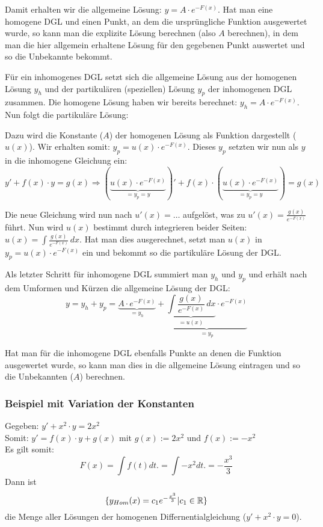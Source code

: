 Damit erhalten wir die allgemeine Lösung: $y = A \cdot e^{-F(x)}$. Hat man eine
homogene DGL und einen Punkt, an dem die ursprüngliche Funktion ausgewertet wurde,
so kann man die explizite Lösung berechnen (also $A$ berechnen), in dem man die
hier allgemein erhaltene Lösung für den gegebenen Punkt auswertet und so die
Unbekannte bekommt.

Für ein inhomogenes DGL setzt sich die allgemeine Lösung aus der homogenen Lösung
$y_h$ und der partikulären (speziellen) Lösung $y_p$ der inhomogenen DGL zusammen.
Die homogene Lösung haben wir bereits berechnet: $y_h = A \cdot e^{-F(x)}$. Nun
folgt die partikuläre Lösung:

Dazu wird die Konstante ($A$) der homogenen Lösung als Funktion dargestellt ($u(x)$).
Wir erhalten somit: $y_p = u(x) \cdot e^{-F(x)}$.
Dieses $y_p$ setzten wir nun als $y$ in die inhomogene Gleichung ein:
{\small
\[
y' + f(x) \cdot y = g(x) \Rightarrow (\underbrace{u(x) \cdot e^{-F(x)}}_{= y_p = y})'
+ f(x) \cdot (\underbrace{u(x) \cdot e^{-F(x)}}_{= y_p = y}) = g(x)
\]
}

Die neue Gleichung wird nun nach $u'(x) = \ldots$ aufgelöst, was zu
$u'(x) = \frac{g(x)}{e^{-F(x)}}$ führt. Nun wird $u(x)$ bestimmt durch integrieren
beider Seiten: $u(x) = \int \frac{g(x)}{e^{-F(x)}}\,dx$. Hat man dies ausgerechnet,
setzt man $u(x)$ in $y_p = u(x) \cdot e^{-F(x)}$ ein und bekommt so die partikuläre
Lösung der DGL.

Als letzter Schritt für inhomogene DGL summiert man $y_h$ und $y_p$ und erhält nach
dem Umformen und Kürzen die allgemeine Lösung der DGL:
{\small
\[
y = y_h + y_p = 
\underbrace{A \cdot e^{-F(x)}}_{= y_h} +
\underbrace{\underbrace{\int \frac{g(x)}{e^{-F(x)}}\,dx}_{= u(x)} \cdot e^{-F(x)}}_{= y_p}
\]
}

Hat man für die inhomogene DGL ebenfalls Punkte an denen die Funktion ausgewertet wurde,
so kann man dies in die allgemeine Lösung eintragen und so die Unbekannten ($A$) berechnen.

\subsubsection{Beispiel mit Variation der Konstanten}
Gegeben: $y' + x^2 \cdot y = 2x^2$\\
Somit:  $y' = f(x) \cdot y + g(x)$ mit $g(x) := 2x^2$ und $f(x) :=  - x^2$\\
Es gilt somit:\[
F(x) = \int f(t) dt. =  \int - x^2 dt. = -\frac{x^3}{3}
\]
Dann ist \[
\{y_{Hom}(x) = c_1e^{-\frac{x^3}{3}}| c_1 \in \mathbb{R}\}
\] die Menge aller Lösungen der homogenen Differnentialgleichung ($y' + x^2\cdot y = 0$). \\

